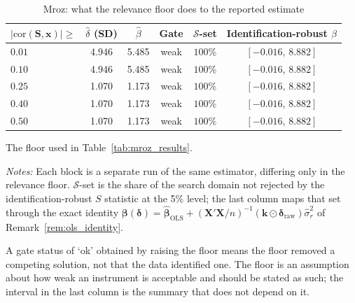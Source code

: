 \begin{table}[htbp]
\centering
\caption{Mroz: what the relevance floor does to the reported estimate}
\label{tab:mroz_sensitivity}
\begin{threeparttable}
\begin{tabular}{lccccc}
\toprule
$|\mathrm{cor}(\mathbf S,\mathbf x)|\ge$ & $\widehat\delta$ (SD) & $\widehat\beta$ & Gate & $\mathcal S$-set & Identification-robust $\beta$ \\
\midrule
$0.01$ & 4.946 & 5.485 & weak & $100$\% & $[-0.016,\,8.882]$ \\
\addlinespace[2pt]
$0.10$ & 4.946 & 5.485 & weak & $100$\% & $[-0.016,\,8.882]$ \\
\addlinespace[2pt]
$0.25$\tnote{a} & 1.070 & 1.173 & weak & $100$\% & $[-0.016,\,8.882]$ \\
\addlinespace[2pt]
$0.40$ & 1.070 & 1.173 & weak & $100$\% & $[-0.016,\,8.882]$ \\
\addlinespace[2pt]
$0.50$ & 1.070 & 1.173 & weak & $100$\% & $[-0.016,\,8.882]$ \\
\bottomrule
\end{tabular}
\begin{tablenotes}
\small
\item[a] The floor used in Table~\ref{tab:mroz_results}.
\item \textit{Notes:} Each block is a separate run of the same estimator,
differing only in the relevance floor. $\mathcal S$-set is the share of
the search domain not rejected by the identification-robust $S$ statistic
at the 5\% level; the last column maps that set through the exact identity
$\boldsymbol\beta(\boldsymbol\delta)=
\widehat{\boldsymbol\beta}_{\mathrm{OLS}}
+(\mathbf X'\mathbf X/n)^{-1}(\mathbf k\odot\boldsymbol\delta_{\mathrm{raw}})
\widehat\sigma_r^2$ of Remark~\ref{rem:ols_identity}.
\item A gate status of `ok' obtained by raising the floor means the floor
removed a competing solution, not that the data identified one. The floor
is an assumption about how weak an instrument is acceptable and should be
stated as such; the interval in the last column is the summary that does
not depend on it.
\end{tablenotes}
\end{threeparttable}
\end{table}
